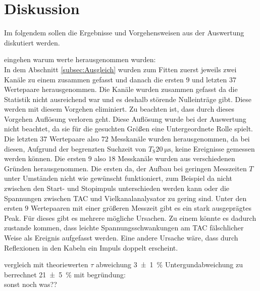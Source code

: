 
\section{Diskussion}
\label{sec:Diskussion}
Im folgendem sollen die Ergebnisse und Vorgehensweisen aus der Auswertung diskutiert werden.

eingehen warum werte herausgenommen wurden:\\
In dem Abschnitt \ref{subsec:Ausgleich} wurden zum Fitten zuerst jeweils zwei Kanäle zu einem zusammen gefasst und danach die ersten $9$ und letzten $37$ Wertepaare herausgenommen.
Die Kanäle wurden zusammen gefasst da die Statistik nicht ausreichend war und es deshalb störende Nulleinträge gibt. Diese werden mit diesem Vorgehen eliminiert. Zu beachten ist, dass durch dieses Vorgehen Auflösung verloren geht. Diese Auflösung wurde bei der Auswertung nicht beachtet, da sie für die gesuchten Größen eine Untergeordnete Rolle spielt. Die letzten $37$ Wertepaare also $72$ Messkanäle wurden herausgenommen, da bei diesen, Aufgrund der begrenzten Suchzeit von $T_\text{S}\SI{20}{\micro\second}$, keine Ereignisse gemessen werden können. Die ersten $9$ also $18$ Messkanäle wurden aus verschiedenen Gründen herausgenommen. Die ersten da, der Aufbau bei geringen Messzeiten $T$ unter Umständen nicht wie gewünscht funktioniert, zum Beispiel da nicht zwischen den Start- und Stopimpuls unterschieden werden kann oder die Spannungen zwischen TAC und Vielkanalanalysator zu gering sind. Unter den ersten $9$ Wertepaaren mit einer größeren Messzeit gibt es ein stark ausgeprägtes Peak. Für dieses gibt es mehrere mögliche Ursachen. Zu einem könnte es dadurch zustande kommen, dass leichte Spannungsschwankungen am TAC fälschlicher Weise als Ereignis aufgefasst werden. Eine andere Ursache wäre, dass durch Reflexionen in den Kabeln ein Impuls doppelt erscheint.





vergleich mit theoriewerten $\tau$ abweichung \SI{3(1)}{\percent} Untergundabweichung zu berrechnet \SI{21(5)}{\percent}
mit begründung:\\





sonst noch was??